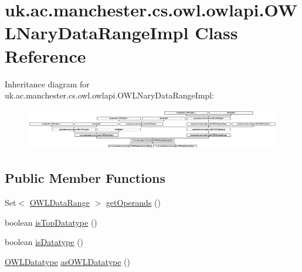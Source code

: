 \hypertarget{classuk_1_1ac_1_1manchester_1_1cs_1_1owl_1_1owlapi_1_1_o_w_l_nary_data_range_impl}{\section{uk.\-ac.\-manchester.\-cs.\-owl.\-owlapi.\-O\-W\-L\-Nary\-Data\-Range\-Impl Class Reference}
\label{classuk_1_1ac_1_1manchester_1_1cs_1_1owl_1_1owlapi_1_1_o_w_l_nary_data_range_impl}
}
Inheritance diagram for uk.\-ac.\-manchester.\-cs.\-owl.\-owlapi.\-O\-W\-L\-Nary\-Data\-Range\-Impl\-:\begin{figure}[H]
\begin{center}
\leavevmode
\includegraphics[height=1.819870cm]{classuk_1_1ac_1_1manchester_1_1cs_1_1owl_1_1owlapi_1_1_o_w_l_nary_data_range_impl}
\end{center}
\end{figure}
\subsection*{Public Member Functions}
\begin{DoxyCompactItemize}
\item 
Set$<$ \hyperlink{interfaceorg_1_1semanticweb_1_1owlapi_1_1model_1_1_o_w_l_data_range}{O\-W\-L\-Data\-Range} $>$ \hyperlink{classuk_1_1ac_1_1manchester_1_1cs_1_1owl_1_1owlapi_1_1_o_w_l_nary_data_range_impl_af1530d29d2be85d147a8effdf5fb2995}{get\-Operands} ()
\item 
boolean \hyperlink{classuk_1_1ac_1_1manchester_1_1cs_1_1owl_1_1owlapi_1_1_o_w_l_nary_data_range_impl_a7664247445be2ef8910d383001bcc1c3}{is\-Top\-Datatype} ()
\item 
boolean \hyperlink{classuk_1_1ac_1_1manchester_1_1cs_1_1owl_1_1owlapi_1_1_o_w_l_nary_data_range_impl_ab455146b14a56e5e8b1dc8408695a0e6}{is\-Datatype} ()
\item 
\hyperlink{interfaceorg_1_1semanticweb_1_1owlapi_1_1model_1_1_o_w_l_datatype}{O\-W\-L\-Datatype} \hyperlink{classuk_1_1ac_1_1manchester_1_1cs_1_1owl_1_1owlapi_1_1_o_w_l_nary_data_range_impl_ac236e88bf5c305aedbd9e6d266de7ab9}{as\-O\-W\-L\-Datatype} ()
\end{DoxyCompactItemize}
